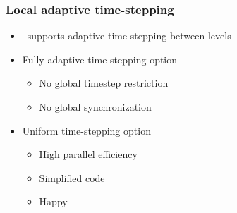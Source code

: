     \begin{frame}[fragile] \frametitle{Local adaptive time-stepping}
      \begin{itemize}
        \item \enzo\ supports adaptive time-stepping between levels
        \item Fully adaptive time-stepping option
        \begin{itemize}
          \item No global timestep restriction
          \item No global synchronization
        \end{itemize}
        \item Uniform time-stepping option
        \begin{itemize}
          \item High parallel efficiency
          \item Simplified code
          \item Happy
        \end{itemize}
      \end{itemize}
\end{frame}
